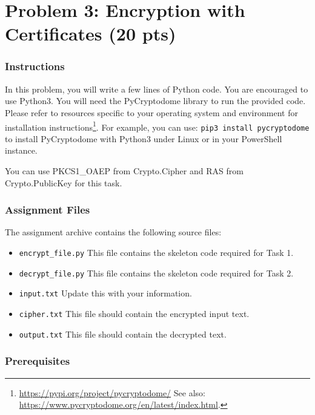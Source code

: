 \documentclass[11pt,letterpaper]{article}
\begin{document}
\newpage
\section*{Problem 3:  Encryption with Certificates ({20 pts})}

\subsubsection*{Instructions}

In this problem, you will write a few lines of Python code. You are encouraged to use Python3. You will need the PyCryptodome library to run the provided code. Please refer to resources specific to your operating system and environment for installation instructions\footnote{\url{https://pypi.org/project/pycryptodome/} See also:  \url{https://www.pycryptodome.org/en/latest/index.html}.}. For example, you can use: \texttt{pip3 install pycryptodome} to install PyCryptodome with Python3 under Linux or in your PowerShell instance. 

\medskip
\noindent You can use PKCS1\_OAEP from Crypto.Cipher and RAS from Crypto.PublicKey for this task. 

\medskip
\subsubsection*{Assignment Files}
The assignment archive contains the following source files:

\begin{itemize}[nolistsep]
	\item \texttt{encrypt\_file.py} This file contains the skeleton code required for Task 1.
	\item \texttt{decrypt\_file.py} This file contains the skeleton code required for Task 2.
        \item \texttt{input.txt} Update this with your information.
        \item \texttt{cipher.txt} This file should contain the encrypted input text.
        \item \texttt{output.txt} This file should contain the decrypted text.
\end{itemize}


\subsubsection*{Prerequisites}
\end{document}

